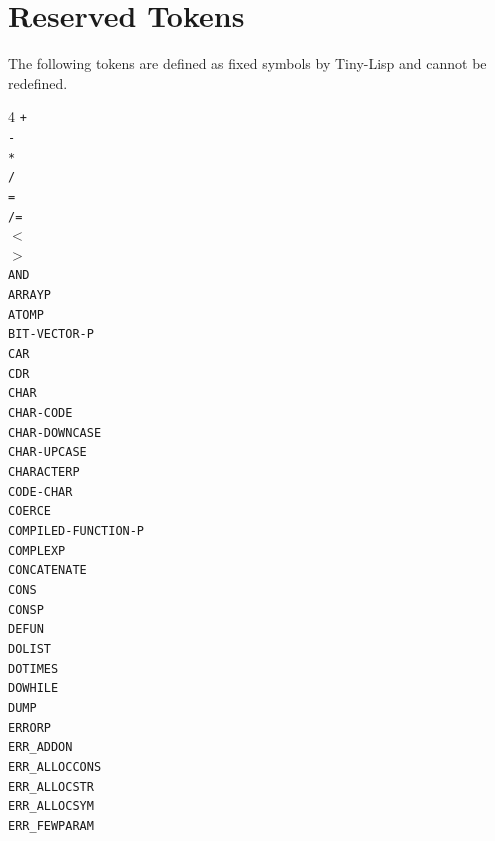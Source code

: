 \documentclass[10pt, openany]{book}
\newcommand{\keyword}[1]{\texttt{#1}}
\newcommand{\tl}{Tiny-Lisp}
\begin{document}
\section{Reserved Tokens}
The following tokens are defined as fixed symbols by \tl{} and cannot be redefined.
\begin{multicols}{4}
  \keyword{+}\\
  \keyword{-}\\
  \keyword{*}\\
  \keyword{/}\\
  \keyword{=}\\
  \keyword{/=}\\
  \keyword{$<$}\\
  \keyword{$>$}\\
  \keyword{AND}\\
  \keyword{ARRAYP}\\
  \keyword{ATOMP}\\
  \keyword{BIT-VECTOR-P}\\
  \keyword{CAR}\\
  \keyword{CDR}\\
  \keyword{CHAR}\\
  \keyword{CHAR-CODE}\\
  \keyword{CHAR-DOWNCASE}\\
  \keyword{CHAR-UPCASE}\\
  \keyword{CHARACTERP}\\
  \keyword{CODE-CHAR}\\
  \keyword{COERCE}\\
  \keyword{COMPILED-FUNCTION-P}\\
  \keyword{COMPLEXP}\\
  \keyword{CONCATENATE}\\
  \keyword{CONS}\\
  \keyword{CONSP}\\
  \keyword{DEFUN}\\
  \keyword{DOLIST}\\
  \keyword{DOTIMES}\\
  \keyword{DOWHILE}\\
  \keyword{DUMP}\\
  \keyword{ERRORP}\\
  \keyword{ERR\_ADDON}\\
  \keyword{ERR\_ALLOCCONS}\\
  \keyword{ERR\_ALLOCSTR}\\
  \keyword{ERR\_ALLOCSYM}\\
  \keyword{ERR\_FEWPARAM}\\

\end{multicols}
\end{document}
